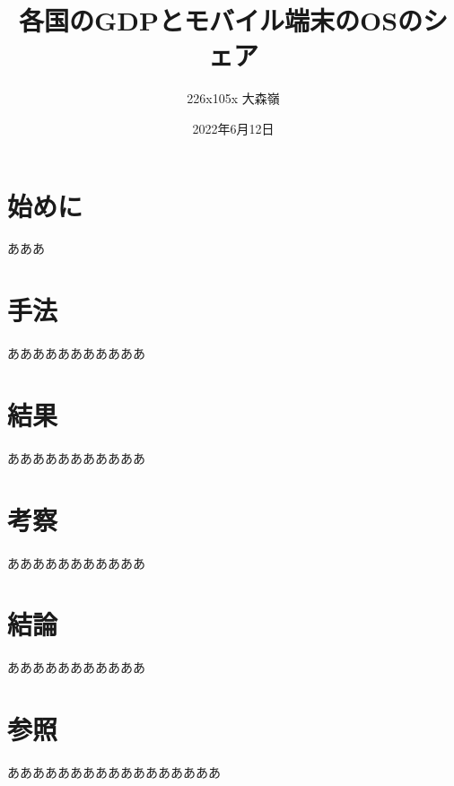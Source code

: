 \documentclass[12pt, a4paper]{jarticle}
\title{各国のGDPとモバイル端末のOSのシェア}
\author{226x105x 大森嶺}
\date{2022年6月12日}
\begin{document}
\maketitle

\section{始めに}
あああ

\section{手法}
あああああああああああ

\section{結果}
あああああああああああ

\section{考察}
あああああああああああ

\section{結論}
あああああああああああ

\section{参照}
あああああああああああああああああ
\end{document}
